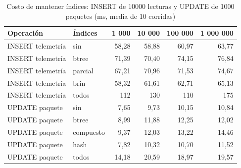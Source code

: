 \begin{table}[H]
\centering
\small
\caption{Costo de mantener índices: INSERT de 10000 lecturas y UPDATE de 1000 paquetes (ms, media de 10 corridas)}
\label{tab:actualizacion}
\begin{tabular}{llrrrr}
\toprule
Operación & Índices & 1 000 & 10 000 & 100 000 & 1 000 000 \\
\midrule
INSERT telemetría & sin & 58,28 & 58,88 & 60,97 & 63,77 \\
INSERT telemetría & btree & 71,39 & 70,40 & 74,15 & 76,84 \\
INSERT telemetría & parcial & 67,21 & 70,96 & 71,53 & 74,67 \\
INSERT telemetría & brin & 58,32 & 61,61 & 62,71 & 65,13 \\
INSERT telemetría & todos & 112 & 130 & 110 & 175 \\
\midrule
UPDATE paquete & sin & 7,65 & 9,73 & 10,15 & 10,84 \\
UPDATE paquete & btree & 8,99 & 11,88 & 12,25 & 12,02 \\
UPDATE paquete & compuesto & 9,37 & 12,03 & 13,22 & 14,46 \\
UPDATE paquete & hash & 7,82 & 10,32 & 10,70 & 11,52 \\
UPDATE paquete & todos & 14,18 & 20,59 & 18,97 & 19,57 \\
\bottomrule
\end{tabular}
\end{table}
